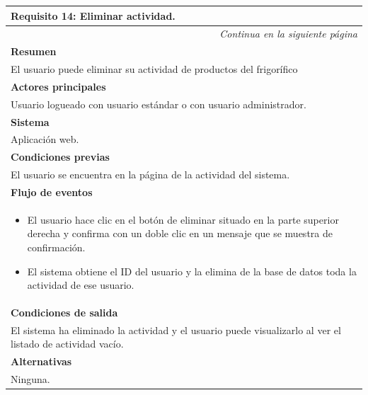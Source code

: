 \begin{longtable}{|p{}|}
\hline
 \rowcolor[gray]{.5}
 \color{white}\textbf{Requisito 14: Eliminar actividad.} \\
\hline
\endfirsthead
\endhead
\hline \multicolumn{1}{r}{\textit{Continua en la siguiente página}} \\
\endfoot
\endlastfoot
    \rowcolor[gray]{.9}
     \textbf{Resumen} \\
     \hline
     El usuario puede eliminar su actividad de productos del frigorífico \\
     \hline
     \rowcolor[gray]{.9}
     \textbf{Actores principales} \\
     \hline
     Usuario logueado con usuario estándar o con usuario administrador. \\
     \hline
     \rowcolor[gray]{.9}
     \textbf{Sistema} \\
     \hline
     Aplicación web. \\
     \hline
     \rowcolor[gray]{.9}
     \textbf{Condiciones previas} \\
     \hline
     El usuario se encuentra en la página de la actividad del sistema. \\
     \hline
     \rowcolor[gray]{.9}
     \textbf{Flujo de eventos}  \\
     \hline
      \begin{itemize}
         \item El usuario hace clic en el botón de eliminar situado en la parte superior derecha y confirma con un doble clic en un mensaje que se muestra de confirmación.
         \item El sistema obtiene el ID del usuario y la elimina de la base de datos toda la actividad de ese usuario.
     \end{itemize} \\
     \hline
     \rowcolor[gray]{.9}
     \textbf{Condiciones de salida} \\
     \hline
     El sistema ha eliminado la actividad y el usuario puede visualizarlo al ver el listado de actividad vacío. \\
     \hline
     \rowcolor[gray]{.9}
     \textbf{Alternativas}  \\
     \hline
      Ninguna.\\
     \hline
\end{longtable}

